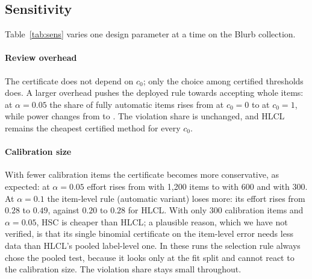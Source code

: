\documentclass[preprint,12pt]{elsarticle}
\theoremstyle{definition}
\theoremstyle{remark}
\newcommand{\hlcl}{\textup{\textsc{HLCL}}}
\begin{document}
\subsection{Sensitivity}
\label{sec:exp-sens}

\begin{table}[t]
\centering
\scriptsize
\setlength{\tabcolsep}{3pt}
\caption{Sensitivity of \hlcl{} to the review overhead $c_0$, the calibration
size $n_{\mathrm{cal}}$ and the confidence level $\delta$ (Blurb collection,
annotator A, 100 splits). The last three columns give the effort of the
certified baselines under the same setting; Item-cert.\ here uses the automatic
test selection, not the per-setting best variant of Table~\ref{tab:main}.}
\label{tab:sens}

\end{table}

Table~\ref{tab:sens} varies one design parameter at a time on the Blurb
collection.

\paragraph{Review overhead}
The certificate does not depend on $c_0$; only the choice among certified
thresholds does. A larger overhead pushes the deployed rule towards accepting
whole items: at $\alpha=0.05$ the share of fully automatic items rises from
 at $c_0=0$ to
 at $c_0=1$, while power changes from
 to . The
violation share is unchanged, and \hlcl{} remains the cheapest certified method
for every $c_0$.

\paragraph{Calibration size}
With fewer calibration items the certificate becomes more conservative, as
expected: at $\alpha=0.05$ effort rises from  with
1,200 items to  with 600 and
 with 300. At $\alpha=0.1$ the item-level
rule (automatic variant) loses more: its effort rises from $0.28$ to $0.49$,
against $0.20$ to $0.28$ for \hlcl{}.
With only 300 calibration items and $\alpha=0.05$, HSC is cheaper than \hlcl{};
a plausible reason, which we have not verified, is that its single binomial
certificate on the item-level error needs less data than \hlcl{}'s pooled
label-level one. In these runs the selection rule always chose the pooled test,
because it looks only at the fit split and cannot react to the calibration size.
The violation share stays small throughout.
\end{document}
